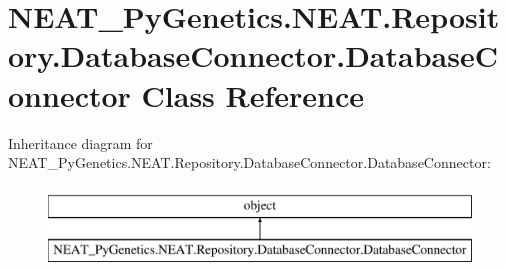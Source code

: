 \hypertarget{classNEAT__PyGenetics_1_1NEAT_1_1Repository_1_1DatabaseConnector_1_1DatabaseConnector}{}\section{N\+E\+A\+T\+\_\+\+Py\+Genetics.\+N\+E\+A\+T.\+Repository.\+Database\+Connector.\+Database\+Connector Class Reference}
\label{classNEAT__PyGenetics_1_1NEAT_1_1Repository_1_1DatabaseConnector_1_1DatabaseConnector}
Inheritance diagram for N\+E\+A\+T\+\_\+\+Py\+Genetics.\+N\+E\+A\+T.\+Repository.\+Database\+Connector.\+Database\+Connector\+:\begin{figure}[H]
\begin{center}
\leavevmode
\includegraphics[height=2.000000cm]{classNEAT__PyGenetics_1_1NEAT_1_1Repository_1_1DatabaseConnector_1_1DatabaseConnector}
\end{center}
\end{figure}
